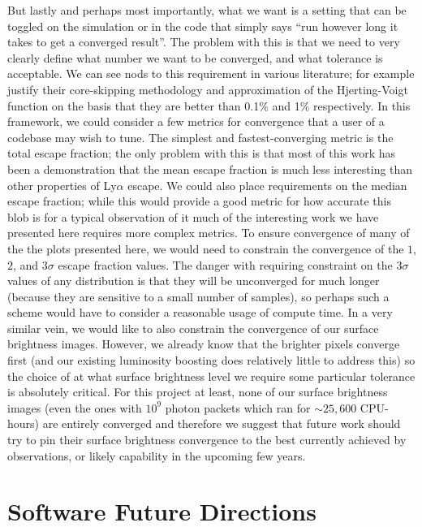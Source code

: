 But lastly and perhaps most importantly, what we want is a setting that can be toggled on the simulation or in the code that simply says ``run however long it takes to get a converged result''.
The problem with this is that we need to very clearly define what number we want to be converged, and what tolerance is acceptable.
We can see nods to this requirement in various literature; for example \citet{Smith2014} justify their core-skipping methodology and approximation of the Hjerting-Voigt function on the basis that they are better than 0.1\% and 1\% respectively.
In this framework, we could consider a few metrics for convergence that a user of a codebase may wish to tune.
The simplest and fastest-converging metric is the total escape fraction; the only problem with this is that most of this work has been a demonstration that the mean escape fraction is much less interesting than other properties of Ly$\alpha$ escape.
We could also place requirements on the median escape fraction; while this would provide a good metric for how accurate this blob is for a typical observation of it much of the interesting work we have presented here requires more complex metrics.
To ensure convergence of many of the the plots presented here, we would need to constrain the convergence of the $1$, $2$, and $3\sigma$ escape fraction values.
The danger with requiring constraint on the $3\sigma$ values of any distribution is that they will be unconverged for much longer (because they are sensitive to a small number of samples), so perhaps such a scheme would have to consider a reasonable usage of compute time.
In a very similar vein, we would like to also constrain the convergence of our surface brightness images.
However, we already know that the brighter pixels converge first (and our existing luminosity boosting does relatively little to address this) so the choice of at what surface brightness level we require some particular tolerance is absolutely critical.
For this project at least, none of our surface brightness images (even the ones with $10^{9}$ photon packets which ran for $\sim25,600$ CPU-hours) are entirely converged and therefore we suggest that future work should try to pin their surface brightness convergence to the best currently achieved by observations, or likely capability in the upcoming few years.

\section{Software Future Directions}

